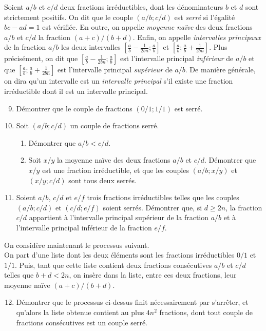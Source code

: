 \documentclass[landscape,twocolumn,leqno,a4paper,10pt]{report} %
\newcommand\n{\noindent}
\renewcommand{\geq}{\geqslant}
\begin{document}
\n Soient $a / b$ et $c / d$ deux fractions irréductibles, dont les dénominateurs $b$ et $d$ sont strictement positifs. On dit que le couple $(a / b ; c / d)$ est \textit{serré} si l'égalité $b c-a d=1$ est vérifiée. En outre, on appelle \textit{moyenne naïve} des deux fractions $a / b$ et $c / d$ la fraction $(a+c) /(b+d)$. Enfin, on appelle \textit{intervalles principaux} de la fraction $a / b$ les deux intervalles $\left[\frac{a}{b}-\frac{1}{2 b n} ; \frac{a}{b}\right]$ et $\left[\frac{a}{b} ; \frac{a}{b}+\frac{1}{2 b n}\right]$. Plus précisément, on dit que $\left[\frac{a}{b}-\frac{1}{2 b n} ; \frac{a}{b}\right]$ est l'intervalle principal \textit{inférieur} de $a / b$ et que $\left[\frac{a}{b} ; \frac{a}{b}+\frac{1}{2 b n}\right]$ est l'intervalle principal \textit{supérieur} de $a / b$. De manière générale, on dira qu'un intervalle est un \textit{intervalle principal} s'il existe une fraction irréductible dont il est un intervalle principal.
\begin{enumerate}\setcounter{enumi}{8}
	\item Démontrer que le couple de fractions $(0 / 1 ; 1 / 1)$ est serré.
	\item Soit $(a / b ; c / d)$ un couple de fractions serré.
	\begin{enumerate}
		\item Démontrer que $a / b<c / d$.
		\item Soit $x / y$ la moyenne naïve des deux fractions $a / b$ et $c / d$. Démontrer que $x / y$ est une fraction irréductible, et que les couples $(a / b ; x / y)$ et $(x / y ; c / d)$ sont tous deux serrés.
	\end{enumerate}
	\item Soient $a / b$, $c / d$ et $e / f$ trois fractions irréductibles telles que les couples $(a / b ; c / d)$ et $(c / d ; e / f)$ soient serrés. Démontrer que, si $d \geq 2 n$, la fraction $c / d$ appartient à l'intervalle principal supérieur de la fraction $a / b$ et à l'intervalle principal inférieur de la fraction $e / f$.
\end{enumerate}

\n On considère maintenant le processus suivant.\\
On part d'une liste dont les deux éléments sont les fractions irréductibles $0 / 1$ et $1 / 1$. Puis, tant que cette liste contient deux fractions consécutives $a / b$ et $c / d$ telles que $b+d<2 n$, on insère dans la liste, entre ces deux fractions, leur moyenne naïve $(a+c) /(b+d)$.

\begin{enumerate}\setcounter{enumi}{11}
	\item Démontrer que le processus ci-dessus finit nécessairement par s'arrêter, et qu'alors la liste obtenue contient au plus $4 n^{2}$ fractions, dont tout couple de fractions consécutives est un couple serré.	
\end{enumerate}
\end{document}
